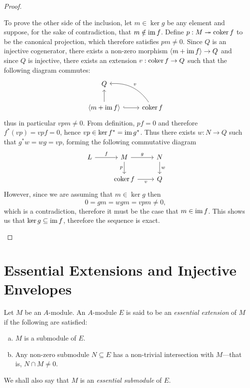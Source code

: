 \begin{proof}
\begin{itemize}
              To prove the other side of the inclusion, let \(m \in \ker g\) be any element
              and suppose, for the sake of contradiction, that \(m \notin \operatorname{im} f\). Define \(p: M
              \twoheadrightarrow \operatorname{coker} f\) to be the canonical projection, which therefore satisfies \(p
              m \neq 0\). Since \(Q\) is an injective cogenerator, there exists a non-zero morphism
              \(\langle m + \operatorname{im} f \rangle \to Q\) and since \(Q\) is injective, there exists an extension
              \(v: \operatorname{coker} f \to Q\) such that the following diagram commutes:
              \[
                  \begin{tikzcd}
                      Q & \\
                      \langle m + \im f \rangle \ar[r, hook] \ar[u]
                      &\coker f \ar[lu, bend right, "v"']
                  \end{tikzcd}
              \]
              thus in particular \(v p m \neq 0\). From definition, \(p f = 0\) and therefore
              \(f^{*}(v p) = v p f = 0\), hence \(v p \in \ker f^{*} = \operatorname{im} g^{*}\). Thus there
              exists \(w: N \to Q\) such that \(g^{*} w = w g = v p\), forming the following
              commutative diagram
              \[
                  \begin{tikzcd}
                      L \ar[r, "f"] &M \ar[r, "g"] \ar[d, "p"'] &N \ar[d, "w"] \\
                      &\coker f \ar[r, "v"'] &Q
                  \end{tikzcd}
              \]
              However, since we are assuming that \(m \in \ker g\) then
              \[
                  0 = g m = w g m = v p m \neq 0,
              \]
              which is a contradiction, therefore it must be the case that \(m \in \operatorname{im}
              f\). This shows us that \(\ker g \subseteq \operatorname{im} f\), therefore the sequence is exact.
    \end{itemize}
\end{proof}

\section{Essential Extensions and Injective Envelopes}

\begin{definition}
    \label{def:essential-extension}
    Let \(M\) be an \(A\)-module. An \(A\)-module \(E\) is said to be an
    \emph{essential extension} of \(M\) if the following are satisfied:
    \begin{enumerate}[(a)]\setlength\itemsep{0em}
        \item \(M\) is a submodule of \(E\).
        \item Any non-zero submodule \(N \subseteq E\) has a non-trivial intersection with
              \(M\)---that is, \(N \cap M \neq 0\).
    \end{enumerate}
    We shall also say that \(M\) is an \emph{essential submodule} of \(E\).
\end{definition}

